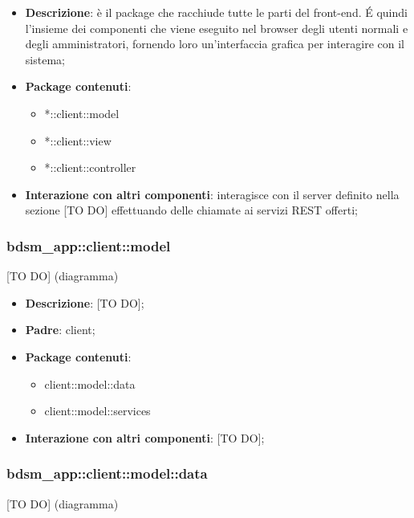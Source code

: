 	\begin{itemize}
		\item \textbf{Descrizione}: è il package che racchiude tutte le parti del front-end. \'E quindi l'insieme dei componenti che viene eseguito nel browser degli utenti normali e degli amministratori, fornendo loro un'interfaccia grafica per interagire con il sistema;
		\item \textbf{Package contenuti}:
			\begin{itemize}
				\item *::client::model
				\item *::client::view
				\item *::client::controller
			\end{itemize}
		\item \textbf{Interazione con altri componenti}: interagisce con il server definito nella sezione [TO DO] effettuando delle chiamate ai servizi REST offerti;
	\end{itemize}

	\pagebreak

	\subsubsection{bdsm\_app::client::model} %
	\label{ssub:bdsm_app_client_model}
	[TO DO] (diagramma) \newline \newline

	\begin{itemize}
		\item \textbf{Descrizione}: [TO DO];
		\item \textbf{Padre}: client;
		\item \textbf{Package contenuti}:
			\begin{itemize}
				\item client::model::data
				\item client::model::services
			\end{itemize}
		\item \textbf{Interazione con altri componenti}: [TO DO];
	\end{itemize}


	\subsubsection{bdsm\_app::client::model::data} %
	\label{ssub:bdsm_app_client_model_data}
	[TO DO] (diagramma) \newline \newline

